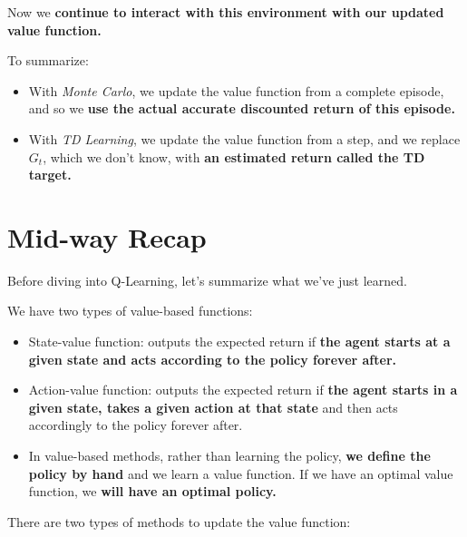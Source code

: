 \documentclass[11pt,a4paper]{article}
\begin{document}
Now we \textbf{continue to interact with this environment with our updated value function.}


To summarize:

\begin{itemize}
\tightlist
\item
  With \emph{Monte Carlo}, we update the value function from a complete episode, and so we \textbf{use the actual accurate discounted return of this episode.}
\item
  With \emph{TD Learning}, we update the value function from a step, and we replace \(G_t\), which we don't know, with \textbf{an estimated return called the TD target.}
\end{itemize}


\section{Mid-way Recap}\label{mid-way-recap}

Before diving into Q-Learning, let's summarize what we've just learned.

We have two types of value-based functions:

\begin{itemize}
\tightlist
\item
  State-value function: outputs the expected return if \textbf{the agent starts at a given state and acts according to the policy forever after.}
\item
  Action-value function: outputs the expected return if \textbf{the agent starts in a given state, takes a given action at that state} and then acts accordingly to the policy forever after.
\item
  In value-based methods, rather than learning the policy, \textbf{we define the policy by hand} and we learn a value function. If we have an optimal value function, we \textbf{will have an optimal policy.}
\end{itemize}

There are two types of methods to update the value function:
\end{document}
